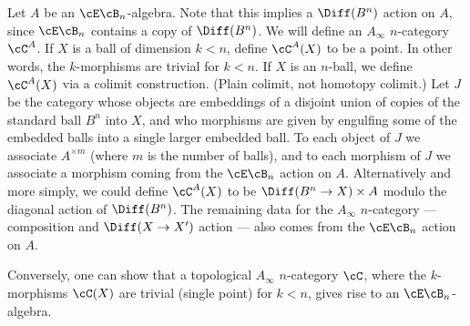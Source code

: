 \begin{example}[$E_n$ algebras]
\rm
\label{ex:e-n-alg}

Let $A$ be an $\cE\cB_n$-algebra.
Note that this implies a $\Diff(B^n)$ action on $A$, 
since $\cE\cB_n$ contains a copy of $\Diff(B^n)$.
We will define an $A_\infty$ $n$-category $\cC^A$.
If $X$ is a ball of dimension $k<n$, define $\cC^A(X)$ to be a point.
In other words, the $k$-morphisms are trivial for $k<n$.
If $X$ is an $n$-ball, we define $\cC^A(X)$ via a colimit construction.
(Plain colimit, not homotopy colimit.)
Let $J$ be the category whose objects are embeddings of a disjoint union of copies of 
the standard ball $B^n$ into $X$, and who morphisms are given by engulfing some of the 
embedded balls into a single larger embedded ball.
To each object of $J$ we associate $A^{\times m}$ (where $m$ is the number of balls), and
to each morphism of $J$ we associate a morphism coming from the $\cE\cB_n$ action on $A$.
Alternatively and more simply, we could define $\cC^A(X)$ to be 
$\Diff(B^n\to X)\times A$ modulo the diagonal action of $\Diff(B^n)$.
The remaining data for the $A_\infty$ $n$-category 
--- composition and $\Diff(X\to X')$ action ---
also comes from the $\cE\cB_n$ action on $A$.


Conversely, one can show that a topological $A_\infty$ $n$-category $\cC$, where the $k$-morphisms
$\cC(X)$ are trivial (single point) for $k<n$, gives rise to 
an $\cE\cB_n$-algebra.
\end{example}






